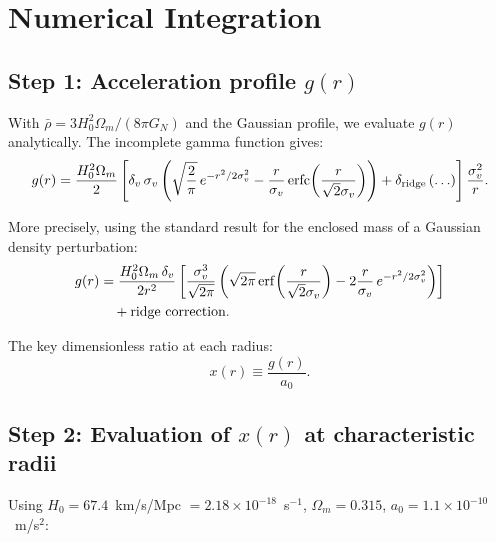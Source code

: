 \documentclass[11pt]{article}
\newcommand{\ee}[1]{\times 10^{#1}}
\newcommand{\GN}{G_N}
\newcommand{\aM}{a_0}
\newcommand{\Hzero}{H_0}
\begin{document}
\section{Numerical Integration}
\label{sec:numerical}

\subsection{Step 1: Acceleration profile $g(r)$}

With $\bar{\rho} = 3\Hzero^2\Omega_m/(8\pi\GN)$ and the Gaussian
profile, we evaluate $g(r)$ analytically. The incomplete gamma function
gives:
\begin{equation}
g(r) = \frac{\Hzero^2\Omega_m}{2}\left[
\delta_v\,\sigma_v\left(\sqrt{\frac{2}{\pi}}\,e^{-r^2/2\sigma_v^2}
- \frac{r}{\sigma_v}\,{\rm erfc}\!\left(\frac{r}{\sqrt{2}\sigma_v}\right)\right)
+ \delta_{\rm ridge}\,(\ldots)\right]
\frac{\sigma_v^2}{r}.
\label{eq:g-analytic}
\end{equation}

More precisely, using the standard result for the enclosed mass of a
Gaussian density perturbation:
\begin{align}
g(r) &= \frac{\Hzero^2\Omega_m\,\delta_v}{2r^2}\left[
\frac{\sigma_v^3}{\sqrt{2\pi}}\left(
\sqrt{2\pi}\,{\rm erf}\!\left(\frac{r}{\sqrt{2}\sigma_v}\right)
- 2\frac{r}{\sigma_v}\,e^{-r^2/2\sigma_v^2}\right)\right]
\nonumber\\
&\quad + \text{ridge correction}.
\label{eq:g-full}
\end{align}

The key dimensionless ratio at each radius:
\begin{equation}
x(r) \equiv \frac{g(r)}{\aM}.
\label{eq:x-of-r}
\end{equation}

\subsection{Step 2: Evaluation of $x(r)$ at characteristic radii}

Using $\Hzero = 67.4$~km/s/Mpc $= 2.18\ee{-18}$~s$^{-1}$,
$\Omega_m = 0.315$, $\aM = 1.1\ee{-10}$~m/s$^2$:
\end{document}
